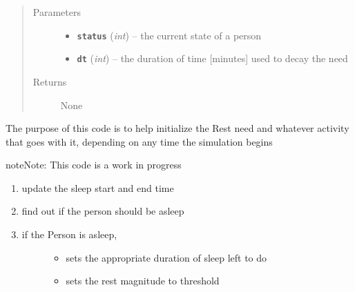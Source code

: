 \documentclass[letterpaper,10pt,english]{sphinxmanual}
\begin{document}
\begin{fulllineitems}
\begin{fulllineitems}
\begin{description}
\begin{itemize}
\end{itemize}

\end{description}
\begin{quote}\begin{description}
\item[{Parameters}] \leavevmode\begin{itemize}
\item {} 
\textbf{\texttt{status}} (\emph{int}) -- the current state of a person

\item {} 
\textbf{\texttt{dt}} (\emph{int}) -- the duration of time {[}minutes{]} used to decay the need

\end{itemize}

\item[{Returns}] \leavevmode
None

\end{description}\end{quote}

\end{fulllineitems}


\begin{fulllineitems}
\label{rest:rest.Rest.initialize}
The purpose of this code is to help initialize the Rest need and whatever activity that goes with         it, depending on any time the simulation begins

\begin{notice}{note}{Note:}
This code is a work in progress
\end{notice}
\begin{enumerate}
\item {} 
update the sleep start and end time

\item {} 
find out if the person should be asleep

\item {} \begin{description}
\item[{if the Person is asleep, }] \leavevmode\begin{itemize}
\item {} 
sets the appropriate duration of sleep left to do

\item {} 
sets the rest magnitude to threshold


\end{itemize}
\end{description}
\end{enumerate}
\end{fulllineitems}
\end{fulllineitems}
\end{document}
